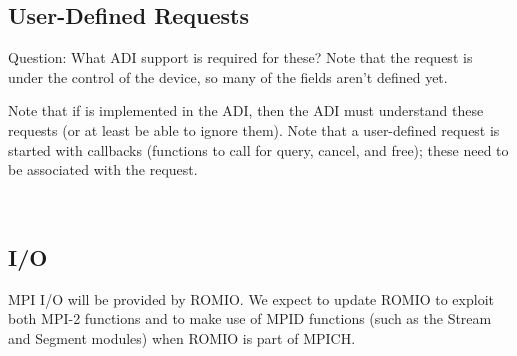 \documentclass{article}
\begin{document}
\subsubsection{}
\subsubsection{}
\subsubsection{}
\subsubsection{}
\subsubsection{}

\subsection{User-Defined Requests}

Question:  What ADI support is required for these?  Note that the
request is under the control of the device, so many of the fields
aren't defined yet.

Note that if  is implemented in the ADI, then the
ADI must understand these requests (or at least be able to ignore
them).
Note that a user-defined request is started with callbacks (functions
to call for query, cancel, and free); these need to be associated with
the request.  

\\

\subsection{I/O}
MPI I/O will be provided by ROMIO.  We expect to update ROMIO to exploit both
MPI-2 functions and to make use of MPID functions (such as the Stream and
Segment modules) when ROMIO is part of MPICH.
\end{document}
